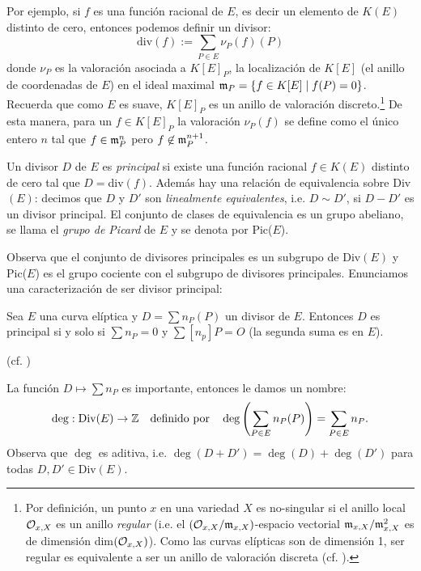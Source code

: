 Por ejemplo, si $f$ es una funci\'on racional de $E$, es decir un elemento de $K(E)$ distinto de
cero, entonces podemos definir un divisor:
\[
  \mathrm{div}(f):=\sum_{P\in E}\nu_P(f) (P)
\]
donde $\nu_P$ es la valoraci\'on asociada a $K[E]_P$, la localizaci\'on de $K[E]$ (el anillo de
coordenadas de $E$) en el ideal maximal $\mathfrak{m}_P=\{f\in K[E]\mid f(P)=0\}$. Recuerda que como $E$
es suave, $K[E]_P$ es un anillo de valoraci\'on discreto.\footnote{Por definici\'on, un punto
  $x$ en una variedad $X$ es no-singular si el anillo local $\mathcal{O}_{x,X}$ es un anillo \emph{regular}
  (i.e. el $(\mathcal{O}_{x,X}/\mathfrak{m}_{x,X})$-espacio vectorial $\mathfrak{m}_{x,X}/\mathfrak{m}_{x,X}^2$ es de dimensi\'on
  dim$(\mathcal{O}_{x,X})$). Como las curvas el\'ipticas son de dimensi\'on 1, ser regular es equivalente
  a ser un anillo de valoraci\'on discreta (cf. \cite[\S9,proposici\'on 9.2]{AtiyahCA}).}
De esta manera, para un $f\in K[E]_P$ la valoraci\'on $\nu_P(f)$ se define como el \'unico entero
$n$ tal que $f\in\mathfrak{m}_P^n$ pero $f\not\in\mathfrak{m}_P^{n+1}$.

\begin{defin} Un divisor $D$ de $E$ es \emph{principal} si existe una funci\'on racional
  $f\in K(E)$ distinto de cero tal que $D=$div$(f)$. Adem\'as hay una relaci\'on
  de equivalencia sobre Div$(E)$: decimos que $D$ y $D'$ son \emph{linealmente equivalentes},
  i.e. $D\sim D'$, si $D-D'$ es un divisor principal. El conjunto de clases de equivalencia
  es un grupo abeliano, se llama  el \emph{grupo de Picard} de $E$ y se denota por Pic($E$).
\end{defin}
\noindent Observa que el conjunto de divisores principales es un subgrupo de Div$(E)$ y Pic($E$) es el
grupo cociente con el subgrupo de divisores principales. Enunciamos una caracterizaci\'on de ser
divisor principal:

\begin{prop}\label{prop:divisor_principal}
  Sea $E$ una curva el\'iptica y $D=\sum n_P(P)$ un divisor de $E$. Entonces $D$ es principal
  si y solo si $\sum n_P=0$ y $\sum [n_p]P=O$ (la segunda suma es en $E$).
\end{prop}
\noindent (cf. \cite[cap\'itulo III, \S3, corolario 3.5]{SilvermanTAOEC})

\begin{nota}
La función $D\mapsto \sum n_P$ es importante, entonces le damos un nombre:
\[
	\deg:\text{Div}(E)\rightarrow\mathbb{Z}\quad\text{definido por}\quad \deg\left( \sum_{P\in E}n_P(P) \right)=\sum_{P\in E}n_P.
\]
Observa que $\deg$ es aditiva, i.e. $\deg(D+D')=\deg(D)+\deg(D')$ para todas $D,D'\in\text{Div}(E)$. 
\end{nota}

